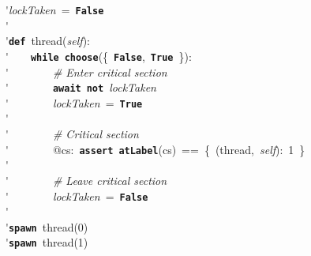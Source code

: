 \'\>\textit{lockTaken}~=~\texttt{\textbf{False}}\\

\'\>\\

\'\>\texttt{\textbf{def}}~thread(\textit{self}):\\

\'\>~~~~\texttt{\textbf{while}}~\texttt{\textbf{choose}}(\{~\texttt{\textbf{False}},~\texttt{\textbf{True}}~\}):\\

\'\>~~~~~~~~\emph{\# Enter critical section}\\

\'\>~~~~~~~~\texttt{\textbf{await}}~\texttt{\textbf{not}}~\textit{lockTaken}\\

\'\>~~~~~~~~\textit{lockTaken}~=~\texttt{\textbf{True}}\\

\'\>\\

\'\>~~~~~~~~\emph{\# Critical section}\\

\'\>~~~~~~~~@cs:~\texttt{\textbf{assert}}~\texttt{\textbf{atLabel}}(cs)~==~\{~(thread,~\textit{self}):~1~\}\\

\'\>\\

\'\>~~~~~~~~\emph{\# Leave critical section}\\

\'\>~~~~~~~~\textit{lockTaken}~=~\texttt{\textbf{False}}\\

\'\>~~~~\\

\'\>\texttt{\textbf{spawn}}~thread(0)\\

\'\>\texttt{\textbf{spawn}}~thread(1)